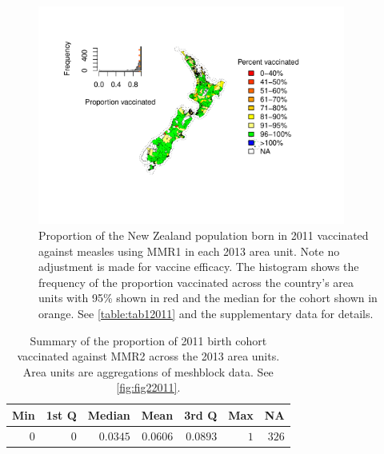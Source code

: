 \documentclass{article}
\begin{document}
\begin{figure}
\begin{center}
    \includegraphics[width=0.9\textwidth]{nir_census_MMR1_NIR_2011.pdf}
 \end{center}
    \caption{Proportion of the New Zealand population born in 2011 vaccinated against measles using MMR1 in each 2013 area unit. Note no adjustment is made for vaccine efficacy. The histogram shows the frequency of the proportion vaccinated across the country's area units with 95\% shown in red and the median for the cohort shown in orange. See \autoref{table:tab12011} and the supplementary data for details.}
\label{fig:fig12011}
\end{figure}

 \vspace{5mm} %
\begin{table}
\begin{center}
\begin{tabular}{rrrrrrr}
\hline\hline
\multicolumn{1}{c}{Min}&\multicolumn{1}{c}{1st Q}&\multicolumn{1}{c}{Median}&\multicolumn{1}{c}{Mean}&\multicolumn{1}{c}{3rd Q}&\multicolumn{1}{c}{Max}&\multicolumn{1}{c}{NA}\tabularnewline
\hline
$0$&$0$&$0.0345$&$0.0606$&$0.0893$&$1$&$326$\tabularnewline
\hline
\end{tabular}\end{center}\caption{Summary of the proportion of 2011 birth cohort vaccinated against MMR2 across the 2013 area units. Area units are aggregations of meshblock data. See \autoref{fig:fig22011}.}
\label{table:tab22011}
\end{table}
\end{document}

